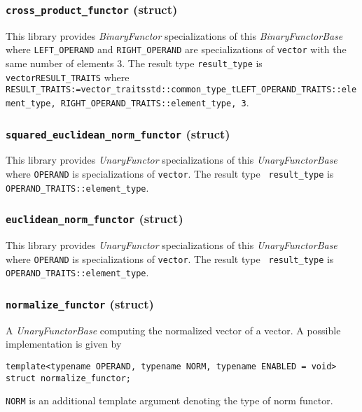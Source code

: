 \documentclass[oneside]{book}
\begin{document}
\subsubsection{\texttt{cross\_product\_functor} (struct)}
This library provides \textit{BinaryFunctor} specializations of this \textit{BinaryFunctorBase}
where \texttt{LEFT\_OPERAND} and \texttt{RIGHT\_OPERAND} are specializations of \texttt{vector}
with the same number of elements $3$. The result type \texttt{result\_type}                  is
\texttt{vector\textlangle RESULT\_TRAITS\textrangle} where\newline
\texttt{
RESULT\_TRAITS:=vector\_traits\textlangle std::common\_type\_t\textlangle{}LEFT\_OPERAND\_TRAITS::element\_type,\newline%
\hphantom{RESULT\_TRAITS:=vector\_traits\textlangle std::common\_type\_t\textlangle}RIGHT\_OPERAND\_TRAITS::element\_type\textrangle,\newline%
\hphantom{RESULT\_TRAITS:=vector\_traits\textlangle}3\textrangle}.

\subsubsection{\texttt{squared\_euclidean\_norm\_functor} (struct)}
This library provides \textit{UnaryFunctor} specializations of this \textit{UnaryFunctorBase}
where \texttt{OPERAND} is specializations of \texttt{vector}. The result type        \texttt{
result\_type} is \texttt{OPERAND\_TRAITS::element\_type\textrangle}.

\subsubsection{\texttt{euclidean\_norm\_functor} (struct)}
This library provides \textit{UnaryFunctor} specializations of this \textit{UnaryFunctorBase}
where \texttt{OPERAND} is specializations of \texttt{vector}. The result type        \texttt{
result\_type} is \texttt{OPERAND\_TRAITS::element\_type}.

\subsubsection{\texttt{normalize\_functor} (struct)}
A \textit{UnaryFunctorBase} computing the normalized vector of a vector.
A possible implementation is given by
\begin{verbatim}
template<typename OPERAND, typename NORM, typename ENABLED = void>
struct normalize_functor;
\end{verbatim}
\texttt{NORM} is an additional template argument denoting the type of norm functor.\newline
\end{document}
